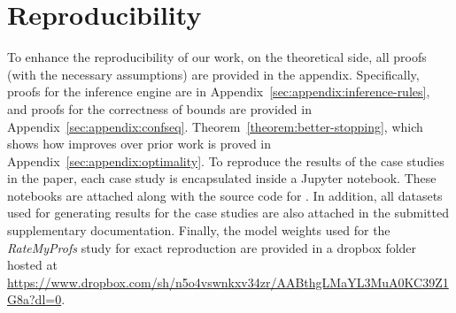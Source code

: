 \newpage \section{Reproducibility}
\label{sec:reproducibility}
To enhance the reproducibility of our work, on the theoretical side, all proofs (with the necessary assumptions) are provided in the appendix. 
Specifically, proofs for the inference engine are in Appendix~\ref{sec:appendix:inference-rules}, and proofs for the correctness of bounds are provided in Appendix~\ref{sec:appendix:confseq}. 
Theorem~\ref{theorem:better-stopping}, which shows how \AVOIRmethodname{} improves over prior work is proved in Appendix~\ref{sec:appendix:optimality}.
To reproduce the results of the case studies in the paper, each case study is encapsulated inside a Jupyter notebook. 
These notebooks are attached along with the source code for \AVOIRmethodname{}.
In addition, all datasets used for generating results for the case studies are also attached in the submitted supplementary documentation.
Finally, the model weights used for the \textit{RateMyProfs} study for exact reproduction are provided in a dropbox folder hosted at  \url{https://www.dropbox.com/sh/n5o4vswnkxv34zr/AABthgLMaYL3MuA0KC39Z1G8a?dl=0}.
\begin{comment}
It is important that the work published in ICLR is reproducible. Authors are strongly encouraged to include a paragraph-long Reproducibility Statement at the end of the main text (before references) to discuss the efforts that have been made to ensure reproducibility. This paragraph should not itself describe details needed for reproducing the results, but rather reference the parts of the main paper, appendix, and supplemental materials that will help with reproducibility. For example, for novel models or algorithms, a link to a anonymous downloadable source code can be submitted as supplementary materials; for theoretical results, clear explanations of any assumptions and a complete proof of the claims can be included in the appendix; for any datasets used in the experiments, a complete description of the data processing steps can be provided in the supplementary materials. Each of the above are examples of things that can be referenced in the reproducibility statement. This optional reproducibility statement will not count toward the page limit, but should not be more than 1 page.
\end{comment}